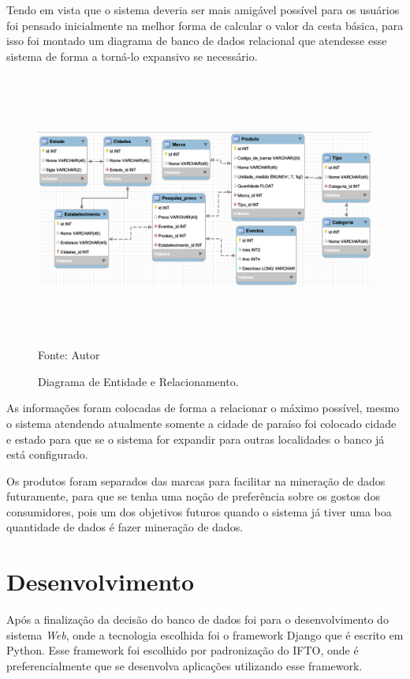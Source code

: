 \documentclass{ifto-tex}
\begin{document}
Tendo em vista que o sistema deveria ser mais amigável  possível para os usuários foi pensado inicialmente na melhor forma de calcular o valor da cesta básica, para isso foi montado um diagrama de banco de dados relacional que atendesse esse sistema de forma a torná-lo expansivo se necessário.
\begin{figure}[H]
	\begin{center}
		\includegraphics[width=16.0cm, height= 9.0cm]{cestadiagrama.png}    %
		Fonte: Autor
		\caption{Diagrama de Entidade e Relacionamento.} 
		
		\label{fig:faces}
	\end{center}
\end{figure}
As informações foram colocadas de forma a relacionar o máximo possível, mesmo o sistema atendendo atualmente somente a cidade de paraíso foi colocado cidade e estado para que se o sistema for expandir para outras localidades o banco já está configurado.

Os produtos foram separados das marcas para facilitar na mineração de dados futuramente, para que se tenha uma noção de preferência sobre os gostos dos consumidores, pois um dos objetivos futuros quando o sistema já tiver uma boa quantidade de dados é fazer mineração de dados.



	
\chapter{Desenvolvimento}
	
Após a finalização da decisão do banco de dados foi para o desenvolvimento do sistema \textit{Web}, onde a tecnologia escolhida foi o framework Django que é escrito em Python. Esse framework foi escolhido por padronização do IFTO, onde é preferencialmente que se desenvolva aplicações utilizando esse framework.
\end{document}
